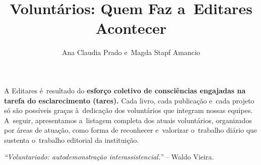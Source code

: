 \documentclass{gescons}
\author{Ana Claudia Prado e~Magda Stapf Amancio}
\title{Voluntários: Quem Faz a~Editares Acontecer}
\begin{document}
    \makeentrevistatitle


    



A Editares é~resultado do \textbf{esforço coletivo de consciências engajadas na tarefa do esclarecimento (tares).} Cada livro, cada publicação e~cada projeto só são possíveis graças à~dedicação dos voluntários que integram nossas equipes. A~seguir, apresentamos a~listagem completa dos atuais voluntários, organizados por áreas de atuação, como forma de reconhecer e~valorizar o~trabalho diário que sustenta o~trabalho editorial da instituição.

\emph{``Voluntariado: autodemonstração interassistencial.''} -- Waldo Vieira.
\end{document}
